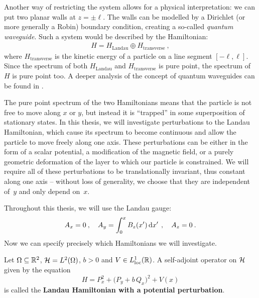 Another way of restricting the system allows for a physical interpretation: we can put two planar walls at $z=\pm\ell$. The walls can be modelled by a Dirichlet (or more generally a Robin) boundary condition, creating a so-called \textit{quantum waveguide}. Such a system would be described by the Hamiltonian:
\begin{align*}
    H = H_\mathrm{Landau} \oplus H_\mathrm{transverse} \: ,
\end{align*}
where $H_\mathrm{transverse}$ is the kinetic energy of a particle on a line segment $[ -\ell, \ell ]$. Since the spectrum of both $H_\mathrm{Landau}$ and $H_\mathrm{transverse}$ is pure point, the spectrum of $H$ is pure point too. A deeper analysis of the concept of quantum waveguides can be found in \citet{ExnerKovarik2015}.

The pure point spectrum of the two Hamiltonians means that the particle is not free to move along $x$ or $y$, but instead it is “trapped” in some superposition of stationary states. In this thesis, we will investigate perturbations to the Landau Hamiltonian, which cause its spectrum to become continuous and allow the particle to move freely along one axis. These perturbations can be either in the form of a scalar potential, a modification of the magnetic field, or a purely geometric deformation of the layer to which our particle is constrained. We will require all of these perturbations to be translationally invariant, thus constant along one axis – without loss of generality, we choose that they are independent of~$y$ and only depend on~$x$.

Throughout this thesis, we will use the Landau gauge:
\begin{align*}
    A_x = 0 \: , \quad
    A_y = \int_0^x B_z(x') \, \mathrm{d}x' \, \: , \quad
    A_z = 0 \: .
\end{align*}
Now we can specify precisely which Hamiltonians we will investigate.

\begin{defn}
    \label{defn-perturb-potential}
    Let $\Omega \subseteq \mathbb{R}^2$, $\mathcal{H} = L^2(\Omega)$, $b>0$ and $V \in L^1_{\text{loc}}(\mathbb{R})$. A self-adjoint operator on $\mathcal{H}$ given by the equation
    \begin{equation*}
        H
        = P^2_x
        + \big( P_y + b \, Q_x \big)^2
        + V(x)
    \end{equation*}
    is called the \textbf{Landau Hamiltonian with a potential perturbation}.
\end{defn}

